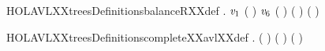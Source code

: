 \begin{SaveVerbatim}{HOLAVLXXtreesDefinitionsbalanceRXXdef}
\HOLTokenTurnstile{} \HOLSymConst{\HOLTokenForall{}}   .
          \HOLSymConst{=}
        \HOLSymConst{=}   \HOLSymConst{\ensuremath{+}}  
         
          \HOLTokenImp{}     
       \HOLTokenBar{}  \ensuremath{\HOLBoundVar{v}\sb{\mathrm{1}}}     \HOLTokenImp{}
            \HOLSymConst{\HOLTokenGt{}}   
             
              \HOLTokenImp{}    (    ) 
           \HOLTokenBar{}  \ensuremath{\HOLBoundVar{v}\sb{\mathrm{6}}}     \HOLTokenImp{}
                (    ) (    )
             (    ) 
          
\end{SaveVerbatim}
\newcommand{\HOLAVLXXtreesDefinitionsbalanceRXXdef}{\UseVerbatim{HOLAVLXXtreesDefinitionsbalanceRXXdef}}
\begin{SaveVerbatim}{HOLAVLXXtreesDefinitionscompleteXXavlXXdef}
\HOLTokenTurnstile{}   \HOLSymConst{=}  \HOLSymConst{\HOLTokenConj{}}
   \HOLSymConst{\HOLTokenForall{}}.  ( ) \HOLSymConst{=}
           ( ) ( )
\end{SaveVerbatim}
